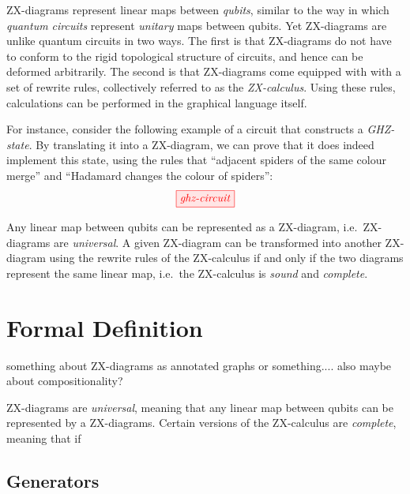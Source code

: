 \documentclass[a4paper, 12pt]{article}
\begin{document}
ZX-diagrams represent linear maps between \emph{qubits}, similar to the way in which \emph{quantum circuits} represent \emph{unitary} maps between qubits. Yet ZX-diagrams are unlike quantum circuits in two ways. The first is that ZX-diagrams do not have to conform to the rigid topological structure of circuits, and hence can be deformed arbitrarily. The second is that ZX-diagrams come equipped with with a set of rewrite rules, collectively referred to as the \emph{ZX-calculus}. Using these rules, calculations can be performed in the graphical language itself.

For instance, consider the following example of a circuit that constructs a \emph{GHZ-state}. By translating it into a ZX-diagram, we can prove that it does indeed implement this state, using the rules that ``adjacent spiders of the same colour merge'' and ``Hadamard changes the colour of spiders'':
\begin{equation*}
    \tikzfig{ghz-circuit}
\end{equation*}

Any linear map between qubits can be represented as a ZX-diagram, i.e.\ ZX-diagrams are \emph{universal}. A given ZX-diagram can be transformed into another ZX-diagram using the rewrite rules of the ZX-calculus if and only if the two diagrams represent the same linear map, i.e.\ the ZX-calculus is \emph{sound} %
and \emph{complete}. %

\section{Formal Definition}

something about ZX-diagrams as annotated graphs or something....
also maybe about compositionality?

ZX-diagrams are \emph{universal}, meaning that any linear map between qubits can be represented by a ZX-diagrams. Certain versions of the ZX-calculus are \emph{complete}, meaning that if 

\subsection{Generators}
\end{document}

